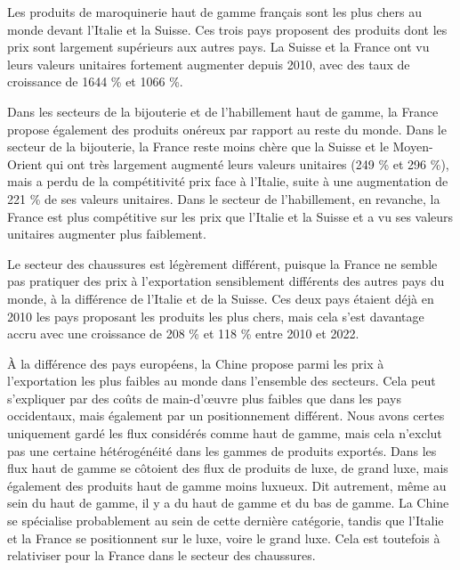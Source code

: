 \documentclass[french,10pt,a4paper]{article}
\begin{document}
Les produits de maroquinerie haut de gamme français sont les plus chers au monde devant l'Italie et la Suisse. Ces trois pays proposent des produits dont les prix sont largement supérieurs aux autres pays. La Suisse et la France ont vu leurs valeurs unitaires fortement augmenter depuis 2010, avec des taux de croissance de 1644 \% et 1066 \%. 

Dans les secteurs de la bijouterie et de l'habillement haut de gamme, la France propose également des produits onéreux par rapport au reste du monde. Dans le secteur de la bijouterie, la France reste moins chère que la Suisse et le Moyen-Orient qui ont très largement augmenté leurs valeurs unitaires (249 \% et 296 \%), mais a perdu de la compétitivité prix face à l'Italie, suite à une augmentation de 221 \% de ses valeurs unitaires. Dans le secteur de l'habillement, en revanche, la France est plus compétitive sur les prix que l'Italie et la Suisse et a vu ses valeurs unitaires augmenter plus faiblement.

Le secteur des chaussures est légèrement différent, puisque la France ne semble pas pratiquer des prix à l'exportation sensiblement différents des autres pays du monde, à la différence de l'Italie et de la Suisse. Ces deux pays étaient déjà en 2010 les pays proposant les produits les plus chers, mais cela s'est davantage accru avec une croissance de 208 \% et 118 \% entre 2010 et 2022.

À la différence des pays européens, la Chine propose parmi les prix à l'exportation les plus faibles au monde dans l'ensemble des secteurs. Cela peut s'expliquer par des coûts de main-d'œuvre plus faibles que dans les pays occidentaux, mais également par un positionnement différent. Nous avons certes uniquement gardé les flux considérés comme haut de gamme, mais cela n'exclut pas une certaine hétérogénéité dans les gammes de produits exportés. Dans les flux haut de gamme se côtoient des flux de produits de luxe, de grand luxe, mais également des produits haut de gamme moins luxueux. Dit autrement, même au sein du haut de gamme, il y a du haut de gamme et du bas de gamme. La Chine se spécialise probablement au sein de cette dernière catégorie, tandis que l'Italie et la France se positionnent sur le luxe, voire le grand luxe. Cela est toutefois à relativiser pour la France dans le secteur des chaussures.
\end{document}
